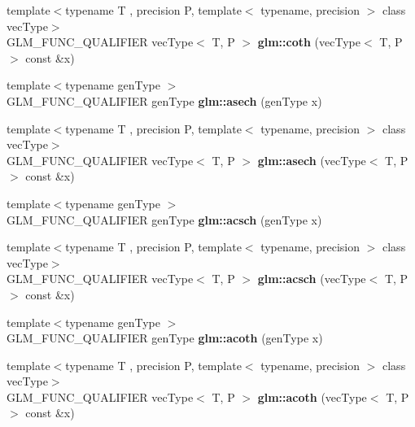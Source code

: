 \begin{DoxyCompactItemize}
\item 
\hypertarget{namespaceglm_ab851ec044cf6fe8cecb0c3d15359b110}{{\footnotesize template$<$typename T , precision P, template$<$ typename, precision $>$ class vec\-Type$>$ }\\G\-L\-M\-\_\-\-F\-U\-N\-C\-\_\-\-Q\-U\-A\-L\-I\-F\-I\-E\-R vec\-Type$<$ T, P $>$ {\bfseries glm\-::coth} (vec\-Type$<$ T, P $>$ const \&x)}\label{namespaceglm_ab851ec044cf6fe8cecb0c3d15359b110}

\item 
\hypertarget{namespaceglm_a8e7a1d844fe8d81ceb0b6642e026ae2f}{{\footnotesize template$<$typename gen\-Type $>$ }\\G\-L\-M\-\_\-\-F\-U\-N\-C\-\_\-\-Q\-U\-A\-L\-I\-F\-I\-E\-R gen\-Type {\bfseries glm\-::asech} (gen\-Type x)}\label{namespaceglm_a8e7a1d844fe8d81ceb0b6642e026ae2f}

\item 
\hypertarget{namespaceglm_afa41f1f0dd76e071da4cece561ae17f2}{{\footnotesize template$<$typename T , precision P, template$<$ typename, precision $>$ class vec\-Type$>$ }\\G\-L\-M\-\_\-\-F\-U\-N\-C\-\_\-\-Q\-U\-A\-L\-I\-F\-I\-E\-R vec\-Type$<$ T, P $>$ {\bfseries glm\-::asech} (vec\-Type$<$ T, P $>$ const \&x)}\label{namespaceglm_afa41f1f0dd76e071da4cece561ae17f2}

\item 
\hypertarget{namespaceglm_ae63e088add8044453b4a0dc31ec19ca6}{{\footnotesize template$<$typename gen\-Type $>$ }\\G\-L\-M\-\_\-\-F\-U\-N\-C\-\_\-\-Q\-U\-A\-L\-I\-F\-I\-E\-R gen\-Type {\bfseries glm\-::acsch} (gen\-Type x)}\label{namespaceglm_ae63e088add8044453b4a0dc31ec19ca6}

\item 
\hypertarget{namespaceglm_a1c7038712456676487a9be253281aa72}{{\footnotesize template$<$typename T , precision P, template$<$ typename, precision $>$ class vec\-Type$>$ }\\G\-L\-M\-\_\-\-F\-U\-N\-C\-\_\-\-Q\-U\-A\-L\-I\-F\-I\-E\-R vec\-Type$<$ T, P $>$ {\bfseries glm\-::acsch} (vec\-Type$<$ T, P $>$ const \&x)}\label{namespaceglm_a1c7038712456676487a9be253281aa72}

\item 
\hypertarget{namespaceglm_ae3076334d7333af3a8ebe33bff68f53f}{{\footnotesize template$<$typename gen\-Type $>$ }\\G\-L\-M\-\_\-\-F\-U\-N\-C\-\_\-\-Q\-U\-A\-L\-I\-F\-I\-E\-R gen\-Type {\bfseries glm\-::acoth} (gen\-Type x)}\label{namespaceglm_ae3076334d7333af3a8ebe33bff68f53f}

\item 
\hypertarget{namespaceglm_a51bfb25efbc539ee80486ea96690359a}{{\footnotesize template$<$typename T , precision P, template$<$ typename, precision $>$ class vec\-Type$>$ }\\G\-L\-M\-\_\-\-F\-U\-N\-C\-\_\-\-Q\-U\-A\-L\-I\-F\-I\-E\-R vec\-Type$<$ T, P $>$ {\bfseries glm\-::acoth} (vec\-Type$<$ T, P $>$ const \&x)}\label{namespaceglm_a51bfb25efbc539ee80486ea96690359a}

\end{DoxyCompactItemize}


